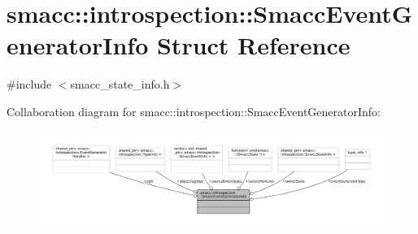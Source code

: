 \hypertarget{structsmacc_1_1introspection_1_1SmaccEventGeneratorInfo}{}\section{smacc\+:\+:introspection\+:\+:Smacc\+Event\+Generator\+Info Struct Reference}
\label{structsmacc_1_1introspection_1_1SmaccEventGeneratorInfo}


{\ttfamily \#include $<$smacc\+\_\+state\+\_\+info.\+h$>$}



Collaboration diagram for smacc\+:\+:introspection\+:\+:Smacc\+Event\+Generator\+Info\+:
\nopagebreak
\begin{figure}[H]
\begin{center}
\leavevmode
\includegraphics[width=350pt]{structsmacc_1_1introspection_1_1SmaccEventGeneratorInfo__coll__graph}
\end{center}
\end{figure}
